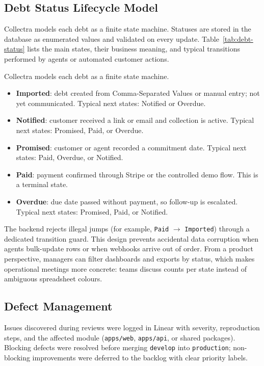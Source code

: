 ﻿\documentclass[12pt,a4paper]{report}
\begin{document}
\subsection{Debt Status Lifecycle Model}

Collectra models each debt as a finite state machine.
Statuses are stored in the database as enumerated values and validated on every update.
Table~\ref{tab:debt-status} lists the main states, their business meaning, and typical
transitions performed by agents or automated customer actions.

\noindent Collectra models each debt as a finite state machine.

\begin{itemize}
  \item \textbf{Imported}: debt created from Comma-Separated Values or manual entry; not yet communicated. Typical next states: Notified or Overdue.
  \item \textbf{Notified}: customer received a link or email and collection is active. Typical next states: Promised, Paid, or Overdue.
  \item \textbf{Promised}: customer or agent recorded a commitment date. Typical next states: Paid, Overdue, or Notified.
  \item \textbf{Paid}: payment confirmed through Stripe or the controlled demo flow. This is a terminal state.
  \item \textbf{Overdue}: due date passed without payment, so follow-up is escalated. Typical next states: Promised, Paid, or Notified.
\end{itemize}

The backend rejects illegal jumps (for example, \texttt{Paid} $\rightarrow$ \texttt{Imported})
through a dedicated transition guard.
This design prevents accidental data corruption when agents bulk-update rows or when
webhooks arrive out of order.
From a product perspective, managers can filter dashboards and exports by status, which
makes operational meetings more concrete: teams discuss counts per state instead of
ambiguous spreadsheet colours.

\subsection{Defect Management}

Issues discovered during reviews were logged in Linear with severity, reproduction steps,
and the affected module (\texttt{apps/web}, \texttt{apps/api}, or shared packages).
Blocking defects were resolved before merging \texttt{develop} into \texttt{production};
non-blocking improvements were deferred to the backlog with clear priority labels.
\end{document}

